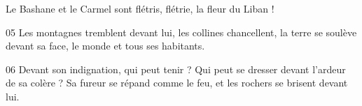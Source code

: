 Le Bashane et le Carmel sont flétris, flétrie, la fleur du Liban !

05 Les montagnes tremblent devant lui, les collines chancellent, la terre se soulève devant sa face, le monde et tous ses habitants.

06 Devant son indignation, qui peut tenir ? Qui peut se dresser devant l’ardeur de sa colère ? Sa fureur se répand comme le feu, et les rochers se brisent devant lui.
